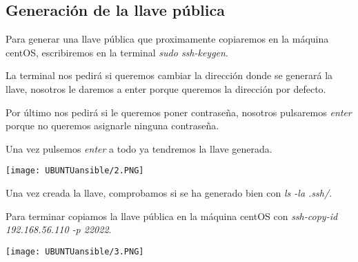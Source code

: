 \documentclass[a4paper, 12pt]{article}
\begin{document}
\subsection{Generación de la llave pública}
\begin{justify}
{Para generar una llave pública que proximamente copiaremos en la máquina centOS, escribiremos en la terminal \textit{sudo ssh-keygen}. \par}
{La terminal nos pedirá si queremos cambiar la dirección donde se generará la llave, nosotros le daremos a enter porque queremos la dirección por defecto. \par}
{Por último nos pedirá si le queremos poner contraseña, nosotros pulsaremos \textit{enter} porque no queremos asignarle ninguna contraseña. \par}
{Una vez pulsemos \textit{enter} a todo ya tendremos la llave generada.}
\end{justify}
\texttt{[image: UBUNTUansible/2.PNG]}
\vspace{0.04cm}
{\par Una vez creada la llave, comprobamos si se ha generado bien con \textit{ls -la .ssh/}.}
\begin{justify}
{\par Para terminar copiamos la llave pública en la máquina centOS con \textit{ssh-copy-id 192.168.56.110 -p 22022}.\par}
\texttt{[image: UBUNTUansible/3.PNG]}
\end{justify}
\end{document}
